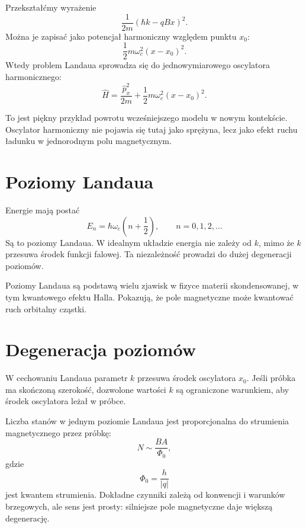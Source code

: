 Przekształćmy wyrażenie
\begin{equation}
    \frac{1}{2m}(\hbar k-qBx)^2.
\end{equation}
Można je zapisać jako potencjał harmoniczny względem punktu \(x_0\):
\begin{equation}
    \frac{1}{2}m\omega_c^2(x-x_0)^2.
\end{equation}
Wtedy problem Landaua sprowadza się do jednowymiarowego oscylatora harmonicznego:
\begin{equation}
    \hat{H}=\frac{\hat{p}_x^2}{2m}+\frac{1}{2}m\omega_c^2(x-x_0)^2.
\end{equation}

To jest piękny przykład powrotu wcześniejszego modelu w nowym kontekście. Oscylator harmoniczny nie pojawia się tutaj jako sprężyna, lecz jako efekt ruchu ładunku w jednorodnym polu magnetycznym.

\section{Poziomy Landaua}

Energie mają postać
\begin{equation}
    E_n=\hbar\omega_c\left(n+\frac{1}{2}\right),
    \qquad
    n=0,1,2,\ldots
\end{equation}
Są to poziomy Landaua. W idealnym układzie energia nie zależy od \(k\), mimo że \(k\) przesuwa środek funkcji falowej. Ta niezależność prowadzi do dużej degeneracji poziomów.

Poziomy Landaua są podstawą wielu zjawisk w fizyce materii skondensowanej, w tym kwantowego efektu Halla. Pokazują, że pole magnetyczne może kwantować ruch orbitalny cząstki.

\section{Degeneracja poziomów}

W cechowaniu Landaua parametr \(k\) przesuwa środek oscylatora \(x_0\). Jeśli próbka ma skończoną szerokość, dozwolone wartości \(k\) są ograniczone warunkiem, aby środek oscylatora leżał w próbce.

Liczba stanów w jednym poziomie Landaua jest proporcjonalna do strumienia magnetycznego przez próbkę:
\begin{equation}
    N\sim \frac{BA}{\Phi_0},
\end{equation}
gdzie
\begin{equation}
    \Phi_0=\frac{h}{|q|}
\end{equation}
jest kwantem strumienia. Dokładne czynniki zależą od konwencji i warunków brzegowych, ale sens jest prosty: silniejsze pole magnetyczne daje większą degenerację.


